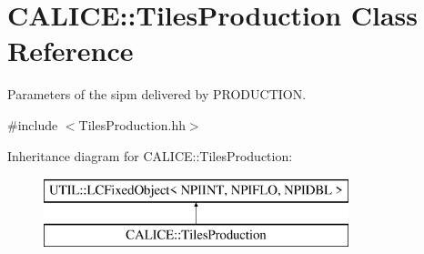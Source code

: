 \section{C\-A\-L\-I\-C\-E\-:\-:Tiles\-Production Class Reference}
\label{classCALICE_1_1TilesProduction}


Parameters of the sipm delivered by P\-R\-O\-D\-U\-C\-T\-I\-O\-N.  




{\ttfamily \#include $<$Tiles\-Production.\-hh$>$}

Inheritance diagram for C\-A\-L\-I\-C\-E\-:\-:Tiles\-Production\-:\begin{figure}[H]
\begin{center}
\leavevmode
\includegraphics[height=2.000000cm]{classCALICE_1_1TilesProduction}
\end{center}
\end{figure}
